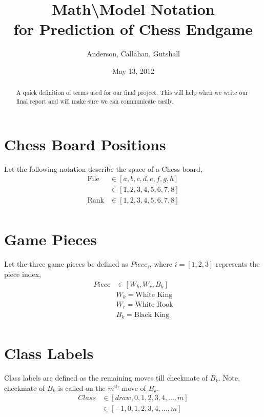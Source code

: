 \documentclass[10pt,fleqn]{article}%
\begin{document}
\title{Math\textbackslash Model Notation\\
for Prediction of Chess Endgame}
\author{Anderson, Callahan, Gutshall}
\date{May 13, 2012}
\maketitle

\begin{abstract}
A quick definition of terms used for our final project.  This will help when we write our final report and will make sure we can communicate easily. 
\end{abstract}

\section{Chess Board Positions}
Let the following notation describe the space of a Chess board,
\begin{equation}
\label{eq:StandardPositions}
\begin{aligned}
	\text{File} &\in \left[a,b,c,d,e,f,g,h\right]\\
	&\in \left[1,2,3,4,5,6,7,8\right]\\
	\text{Rank} &\in \left[1,2,3,4,5,6,7,8\right]\\
\end{aligned}
\end{equation}

\section{Game Pieces}
Let the three game pieces be defined as $Piece_i$, where $i = \left[1,2,3\right]$ represents the piece index,
\begin{equation}
\label{eq:pieces}
\begin{aligned}
	Piece &\in \left[W_k, W_r, B_k\right]\\
	&W_k = \text{White King}\\
	&W_r = \text{White Rook}\\
	&B_k = \text{Black King}\\
\end{aligned}
\end{equation}

\section{Class Labels}
Class labels are defined as the remaining moves till checkmate of $B_k$.  Note, checkmate of $B_k$ is called on the $m^{\text{th}}$ move of $B_k$.
\begin{equation*}
\begin{aligned}
	Class &\in \left[draw,0,1,2,3,4, \dots, m\right]\\
	&\in \left[-1,0,1,2,3,4, \dots, m\right]
\end{aligned}
\end{equation*}
\end{document}
